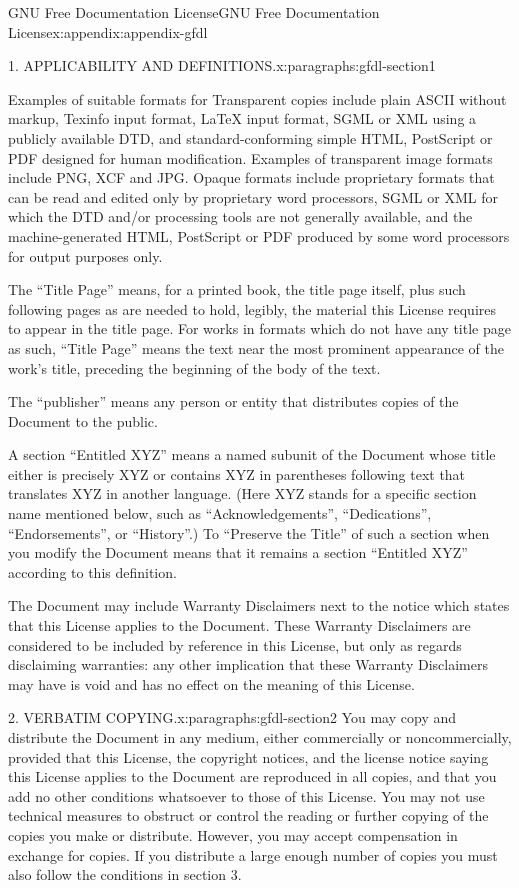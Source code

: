 \documentclass[twoside,10pt,]{tufte-book}
\numberwithin{equation}{part}
\begin{document}
\begin{appendixptx}{GNU Free Documentation License}{}{GNU Free Documentation License}{}{}{x:appendix:appendix-gfdl}
\begin{paragraphs}{1. APPLICABILITY AND DEFINITIONS.}{x:paragraphs:gfdl-section1}
\par
Examples of suitable formats for Transparent copies include plain ASCII without markup, Texinfo input format, LaTeX input format, SGML or XML using a publicly available DTD, and standard-conforming simple HTML, PostScript or PDF designed for human modification. Examples of transparent image formats include PNG, XCF and JPG. Opaque formats include proprietary formats that can be read and edited only by proprietary word processors, SGML or XML for which the DTD and\slash{}or processing tools are not generally available, and the machine-generated HTML, PostScript or PDF produced by some word processors for output purposes only.%
\par
The ``Title Page'' means, for a printed book, the title page itself, plus such following pages as are needed to hold, legibly, the material this License requires to appear in the title page. For works in formats which do not have any title page as such, ``Title Page'' means the text near the most prominent appearance of the work's title, preceding the beginning of the body of the text.%
\par
The ``publisher'' means any person or entity that distributes copies of the Document to the public.%
\par
A section ``Entitled XYZ'' means a named subunit of the Document whose title either is precisely XYZ or contains XYZ in parentheses following text that translates XYZ in another language. (Here XYZ stands for a specific section name mentioned below, such as ``Acknowledgements'', ``Dedications'', ``Endorsements'', or ``History''.) To ``Preserve the Title'' of such a section when you modify the Document means that it remains a section ``Entitled XYZ'' according to this definition.%
\par
The Document may include Warranty Disclaimers next to the notice which states that this License applies to the Document. These Warranty Disclaimers are considered to be included by reference in this License, but only as regards disclaiming warranties: any other implication that these Warranty Disclaimers may have is void and has no effect on the meaning of this License.%
\end{paragraphs}%
\begin{paragraphs}{2. VERBATIM COPYING.}{x:paragraphs:gfdl-section2}%
You may copy and distribute the Document in any medium, either commercially or noncommercially, provided that this License, the copyright notices, and the license notice saying this License applies to the Document are reproduced in all copies, and that you add no other conditions whatsoever to those of this License. You may not use technical measures to obstruct or control the reading or further copying of the copies you make or distribute. However, you may accept compensation in exchange for copies. If you distribute a large enough number of copies you must also follow the conditions in section 3.%

\end{paragraphs}
\end{appendixptx}
\end{document}
